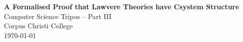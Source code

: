 \documentclass[12pt,a4paper,twoside,openany]{report}
\begin{document}
\pagestyle{empty}
\begin{titlepage}
    \begin{center}
        \vspace*{60mm}
        \Huge \textbf{A Formalised Proof that Lawvere Theories have Csystem
        Structure} \\
        \vspace{5mm}
        Computer Science Tripos -- Part III \\
        \vspace{5mm}
        Corpus Christi College \\
        \vspace{5mm}
        \today
    \end{center}
\end{titlepage}

\tableofcontents
\pagestyle{plain}

\pagestyle{headings}







\end{document}
